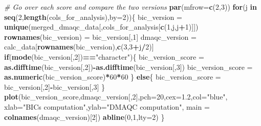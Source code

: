 \documentclass[]{article}
\newenvironment{Shaded}{\begin{snugshade}}{\end{snugshade}}
\newcommand{\KeywordTok}[1]{\textcolor[rgb]{0.13,0.29,0.53}{\textbf{#1}}}
\newcommand{\DataTypeTok}[1]{\textcolor[rgb]{0.13,0.29,0.53}{#1}}
\newcommand{\DecValTok}[1]{\textcolor[rgb]{0.00,0.00,0.81}{#1}}
\newcommand{\FloatTok}[1]{\textcolor[rgb]{0.00,0.00,0.81}{#1}}
\newcommand{\StringTok}[1]{\textcolor[rgb]{0.31,0.60,0.02}{#1}}
\newcommand{\CommentTok}[1]{\textcolor[rgb]{0.56,0.35,0.01}{\textit{#1}}}
\newcommand{\ControlFlowTok}[1]{\textcolor[rgb]{0.13,0.29,0.53}{\textbf{#1}}}
\newcommand{\OperatorTok}[1]{\textcolor[rgb]{0.81,0.36,0.00}{\textbf{#1}}}
\newcommand{\NormalTok}[1]{#1}
\begin{document}
\begin{Shaded}
\begin{Highlighting}[]
\CommentTok{# Go over each score and compare the two versions}
\KeywordTok{par}\NormalTok{(}\DataTypeTok{mfrow=}\KeywordTok{c}\NormalTok{(}\DecValTok{2}\NormalTok{,}\DecValTok{3}\NormalTok{))}
\ControlFlowTok{for}\NormalTok{(j }\ControlFlowTok{in} \KeywordTok{seq}\NormalTok{(}\DecValTok{2}\NormalTok{,}\KeywordTok{length}\NormalTok{(cols_for_analysis),}\DataTypeTok{by=}\DecValTok{2}\NormalTok{))\{}
\NormalTok{  bic_version =}\StringTok{ }\KeywordTok{unique}\NormalTok{(merged_dmaqc_data[,cols_for_analysis[}\KeywordTok{c}\NormalTok{(}\DecValTok{1}\NormalTok{,j,j}\OperatorTok{+}\DecValTok{1}\NormalTok{)]])}
  \KeywordTok{rownames}\NormalTok{(bic_version) =}\StringTok{ }\NormalTok{bic_version[,}\DecValTok{1}\NormalTok{]}
\NormalTok{  dmaqc_version =}\StringTok{ }\NormalTok{calc_data[}\KeywordTok{rownames}\NormalTok{(bic_version),}\KeywordTok{c}\NormalTok{(}\DecValTok{3}\NormalTok{,}\DecValTok{3}\OperatorTok{+}\NormalTok{j}\OperatorTok{/}\DecValTok{2}\NormalTok{)]}
  \ControlFlowTok{if}\NormalTok{(}\KeywordTok{mode}\NormalTok{(bic_version[,}\DecValTok{2}\NormalTok{])}\OperatorTok{==}\StringTok{"character"}\NormalTok{)\{}
\NormalTok{    bic_version_score =}\StringTok{ }\KeywordTok{as.difftime}\NormalTok{(bic_version[,}\DecValTok{2}\NormalTok{])}\OperatorTok{-}\KeywordTok{as.difftime}\NormalTok{(bic_version[,}\DecValTok{3}\NormalTok{])}
\NormalTok{    bic_version_score =}\StringTok{ }\KeywordTok{as.numeric}\NormalTok{(bic_version_score)}\OperatorTok{*}\DecValTok{60}\OperatorTok{*}\DecValTok{60}
\NormalTok{  \}}
  \ControlFlowTok{else}\NormalTok{\{}
\NormalTok{    bic_version_score =}\StringTok{ }\NormalTok{bic_version[,}\DecValTok{2}\NormalTok{]}\OperatorTok{-}\NormalTok{bic_version[,}\DecValTok{3}\NormalTok{]}
\NormalTok{  \}}
  \KeywordTok{plot}\NormalTok{(bic_version_score,dmaqc_version[,}\DecValTok{2}\NormalTok{],}\DataTypeTok{pch=}\DecValTok{20}\NormalTok{,}\DataTypeTok{cex=}\FloatTok{1.2}\NormalTok{,}\DataTypeTok{col=}\StringTok{"blue"}\NormalTok{,}
       \DataTypeTok{xlab=}\StringTok{"BICs computation"}\NormalTok{,}\DataTypeTok{ylab=}\StringTok{"DMAQC computation"}\NormalTok{,}
       \DataTypeTok{main =} \KeywordTok{colnames}\NormalTok{(dmaqc_version)[}\DecValTok{2}\NormalTok{])}
  \KeywordTok{abline}\NormalTok{(}\DecValTok{0}\NormalTok{,}\DecValTok{1}\NormalTok{,}\DataTypeTok{lty=}\DecValTok{2}\NormalTok{)}
\NormalTok{\}}


\end{Highlighting}
\end{Shaded}
\end{document}
